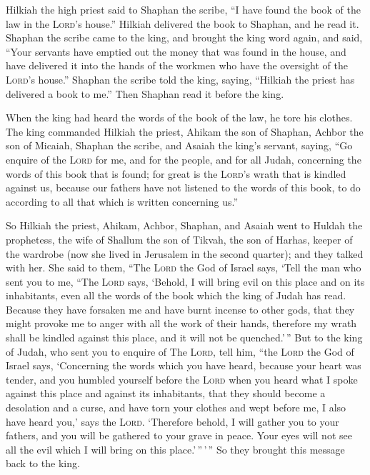  Hilkiah the high priest said to Shaphan the scribe, ``I
have found the book of the law in the \textsc{Lord}'s house.'' Hilkiah
delivered the book to Shaphan, and he read it.  Shaphan
the scribe came to the king, and brought the king word again, and said,
``Your servants have emptied out the money that was found in the house,
and have delivered it into the hands of the workmen who have the
oversight of the \textsc{Lord}'s house.''  Shaphan the
scribe told the king, saying, ``Hilkiah the priest has delivered a book
to me.'' Then Shaphan read it before the king.

 When the king had heard the words of the book of the
law, he tore his clothes.  The king commanded Hilkiah the
priest, Ahikam the son of Shaphan, Achbor the son of Micaiah, Shaphan
the scribe, and Asaiah the king's servant, saying,  ``Go
enquire of the \textsc{Lord} for me, and for the people, and for all
Judah, concerning the words of this book that is found; for great is the
\textsc{Lord}'s wrath that is kindled against us, because our fathers
have not listened to the words of this book, to do according to all that
which is written concerning us.''

 So Hilkiah the priest, Ahikam, Achbor, Shaphan, and
Asaiah went to Huldah the prophetess, the wife of Shallum the son of
Tikvah, the son of Harhas, keeper of the wardrobe (now she lived in
Jerusalem in the second quarter); and they talked with her.
 She said to them, ``The \textsc{Lord} the God of Israel
says, `Tell the man who sent you to me,  ``The
\textsc{Lord} says, `Behold, I will bring evil on this place and on its
inhabitants, even all the words of the book which the king of Judah has
read.  Because they have forsaken me and have burnt
incense to other gods, that they might provoke me to anger with all the
work of their hands, therefore my wrath shall be kindled against this
place, and it will not be quenched.'\,''  But to the king
of Judah, who sent you to enquire of The \textsc{Lord}, tell him, ``the
\textsc{Lord} the God of Israel says, `Concerning the words which you
have heard,  because your heart was tender, and you
humbled yourself before the \textsc{Lord} when you heard what I spoke
against this place and against its inhabitants, that they should become
a desolation and a curse, and have torn your clothes and wept before me,
I also have heard you,' says the \textsc{Lord}. 
`Therefore behold, I will gather you to your fathers, and you will be
gathered to your grave in peace. Your eyes will not see all the evil
which I will bring on this place.'\,''\,'\,'' So they brought this
message back to the king.

